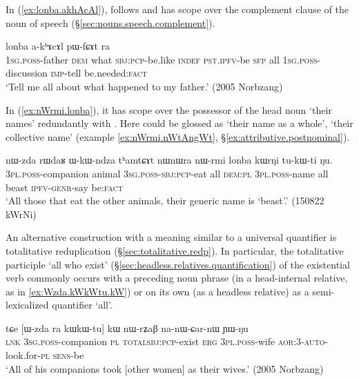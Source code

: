 In (\ref{ex:lonba.akhAcAl}),  follows and has scope over the complement clause of the noun of speech  (§\ref{sec:nouns.speech.complement}).

\begin{exe}
\ex \label{ex:lonba.akhAcAl}
  lonba a-kʰɤcɤl pɯ-fɕɤt ra \\
 \textsc{1sg}.\textsc{poss}-father \textsc{dem} what \textsc{sbj}:\textsc{pcp}-be.like \textsc{indef} \textsc{pst}.\textsc{ipfv}-be \textsc{sfp} all \textsc{1sg}.\textsc{poss}-discussion \textsc{imp}-tell be.needed:\textsc{fact} \\
\glt `Tell me all about what happened to my father.' (2005 Norbzang)
\end{exe}

In (\ref{ex:nWrmi.lonba}), it has scope over the possessor of the head noun  `their names' redundantly with . Here  could be glossed as  `their name as a whole', `their collective name' (example \ref{ex:nWrmi.nWtAngWt}, §\ref{ex:attributive.postnominal}).

\begin{exe}
\ex \label{ex:nWrmi.lonba}
\gll nɯ-zda rɯdaʁ ɯ-kɯ-ndza tʰamtɕɤt nɯnɯra nɯ-rmi lonba kɯrŋi tu-kɯ-ti ŋu. \\
\textsc{3pl}.\textsc{poss}-companion animal \textsc{3sg}.\textsc{poss}-\textsc{sbj}:\textsc{pcp}-eat all \textsc{dem}:\textsc{pl} \textsc{3pl}.\textsc{poss}-name all beast \textsc{ipfv}-\textsc{genr}-say be:\textsc{fact} \\ 
 \glt `All those that eat the other animals, their generic name is `beast'.'  (150822 kWrNi)
\end{exe}
 
An alternative construction with a meaning similar to a universal quantifier is totalitative reduplication (§\ref{sec:totalitative.redp}). In particular, the totalitative participle  `all who exist' (§\ref{sec:headless.relatives.quantification}) of the existential verb  commonly occurs with a preceding noun phrase (in a head-internal relative, as in \ref{ex:Wzda.kWkWtu.kW}) or on its own (as a headless relative) as a semi-lexicalized quantifier `all'. 

\begin{exe}
\ex \label{ex:Wzda.kWkWtu.kW}
\gll tɕe [ɯ-zda ra kɯ\redp{}kɯ-tu] kɯ nɯ-rʑaβ na-nɯ-ɕar-nɯ ɲɯ-ŋu \\
\textsc{lnk} \textsc{3sg}.\textsc{poss}-companion \textsc{pl} \textsc{total}\redp{}\textsc{sbj}:\textsc{pcp}-exist \textsc{erg} \textsc{3pl}.\textsc{poss}-wife \textsc{aor}:3\flobv{}-\textsc{auto}-look.for-\textsc{pl} \textsc{sens}-be \\
\glt `All of his companions took [other women] as their wives.' (2005 Norbzang)
\end{exe}
  
